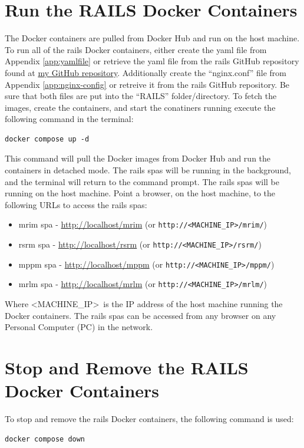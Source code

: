 \section{Run the RAILS Docker Containers}
\label{sec:railsdockercontainers}
The Docker containers are pulled from Docker Hub and run on the host machine. To run all of the \gls{rails} Docker containers, either create the \gls{yaml} file from Appendix \ref{app:yamlfile} or retrieve the \gls{yaml} file from the \gls{rails} GitHub repository found at \href{https://github.com/djbristow/RAILS/tree/master/Docker%20Based}{my GitHub repository}. Additionally create the ``nginx.conf'' file from Appendix \ref{app:nginx-config} or retreive it from the \gls{rails} GitHub repository. Be sure that both files are put into the ``RAILS'' folder/directory. 
To fetch the images, create the containers, and start the conatiners running execute the following command in the terminal:
\begin{verbatim}
docker compose up -d
\end{verbatim}
This command will pull the Docker images from Docker Hub and run the containers in detached mode. The \gls{rails} \glspl{spa} will be running in the background, and the terminal will return to the command prompt.
The \gls{rails} \glspl{spa} will be running on the host machine.
Point a browser, on the host machine, to the following URLs to access the \gls{rails} \glspl{spa}:
\begin{itemize}
    \item \gls{mrim} \gls{spa} - \href{http://localhost/mrim}{http://localhost/mrim} (or \texttt{http://\textless MACHINE\_IP\textgreater /mrim/})
    \item \gls{rsrm} \gls{spa} - \href{http://localhost/rsrm}{http://localhost/rsrm} (or \texttt{http://\textless MACHINE\_IP\textgreater /rsrm/})
    \item \gls{mppm} \gls{spa} - \href{http://localhost/mppm}{http://localhost/mppm} (or \texttt{http://\textless MACHINE\_IP\textgreater /mppm/})
    \item \gls{mrlm} \gls{spa} - \href{http://localhost/mrlm}{http://localhost/mrlm} (or \texttt{http://\textless MACHINE\_IP\textgreater /mrlm/})
\end{itemize}
Where \textless MACHINE\_IP\textgreater\ is the IP address of the host machine running the Docker containers. The \gls{rails} \glspl{spa} can be accessed from any browser on any Personal Computer (PC) in the network.
\section{Stop and Remove the RAILS Docker Containers}
\label{sec:stopremoverailsdockercontainers}
To stop and remove the \gls{rails} Docker containers, the following command is used:
\begin{verbatim}
docker compose down
\end{verbatim}

